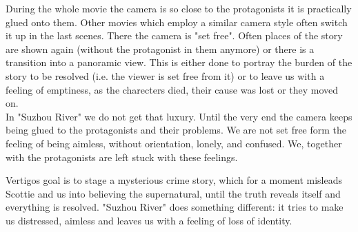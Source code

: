 \documentclass[fleqn,14pt]{article}
\begin{document}
During the whole movie the camera is so close to the protagonists it is practically glued onto them. Other movies which employ
a similar camera style often switch it up in the last scenes. There the camera is "set free". Often places of the story are shown again
(without the protagonist in them anymore) or there is a transition into a panoramic view. This is either done 
to portray the burden of the story to be resolved (i.e. the viewer is set free from it) or to leave us with a feeling of emptiness,
as the charecters died, their cause was lost or they moved on.\\
In "Suzhou River" we do not get that luxury. Until the very end the camera keeps being glued
to the protagonists and their problems. We are not set free form the feeling of being aimless, without orientation, lonely,
and confused. We, together with the protagonists are left stuck with these feelings.

Vertigos goal is to stage a mysterious crime story, which for a moment misleads
Scottie and us into believing the supernatural, until the truth reveals itself and everything is resolved. "Suzhou River" does
something different: it tries to make us distressed, aimless and leaves us with a feeling of loss of identity.\\

\printbibliography 
\end{document}
